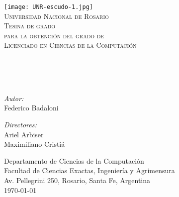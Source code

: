 {%
\thispagestyle{empty}
\begin{center}
    \texttt{[image: UNR-escudo-1.jpg]}
    \\[0.5cm]
    \textsc{\LARGE Universidad Nacional de Rosario}\\[1.5cm]

    \textsc{{\Large Tesina de grado} \\ para la obtenci\'on del grado de \\
     Licenciado en Ciencias de la Computaci\'on}\\[0.5cm]
    \HRule \\[0.4cm] %
        {\huge {} \\[0.4cm]}

    \HRule \\[0.4cm] %
    \noindent
    \begin{minipage}{0.4\textwidth}
        \begin{flushleft} \large
            \emph{Autor:}\\
            Federico Badaloni
        \end{flushleft}
        \end{minipage}%
        \begin{minipage}{0.4\textwidth}
        \begin{flushright} \large
            \emph{Directores:} \\
            Ariel Arbiser\\
            Maximiliano Cristiá\\
        \end{flushright}
    \end{minipage}

\vfill

Departamento de Ciencias de la Computaci\'on\\
Facultad de Ciencias Exactas, Ingenier\'ia y Agrimensura\\
Av. Pellegrini 250, Rosario, Santa Fe, Argentina\\[0.4cm]
{\large \today}

\end{center}
\clearpage
}